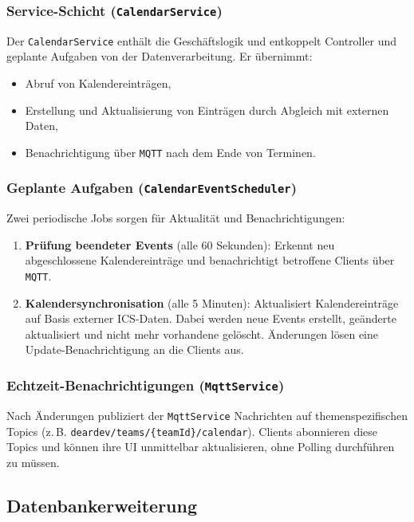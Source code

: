 \documentclass[12pt,a4paper]{report}
\begin{document}
    \subsubsection{Service-Schicht (\texttt{CalendarService})}
        Der \texttt{CalendarService} enthält die Geschäftslogik und entkoppelt Controller und geplante Aufgaben von der Datenverarbeitung.
        Er übernimmt:
        \begin{itemize}
            \item Abruf von Kalendereinträgen,
            \item Erstellung und Aktualisierung von Einträgen durch Abgleich mit externen Daten,
            \item Benachrichtigung über \texttt{MQTT} nach dem Ende von Terminen.
        \end{itemize}

    \subsubsection{Geplante Aufgaben (\texttt{CalendarEventScheduler})}
        Zwei periodische Jobs sorgen für Aktualität und Benachrichtigungen:
        \begin{enumerate}
            \item \textbf{Prüfung beendeter Events} (alle 60 Sekunden):
                Erkennt neu abgeschlossene Kalendereinträge und benachrichtigt betroffene Clients über \texttt{MQTT}.
            \item \textbf{Kalendersynchronisation} (alle 5 Minuten):
                Aktualisiert Kalendereinträge auf Basis externer ICS-Daten.
                Dabei werden neue Events erstellt, geänderte aktualisiert und nicht mehr vorhandene gelöscht.
                Änderungen lösen eine Update-Benachrichtigung an die Clients aus.
        \end{enumerate}

    \subsubsection{Echtzeit-Benachrichtigungen (\texttt{MqttService})}
        Nach Änderungen publiziert der \texttt{MqttService} Nachrichten auf themenspezifischen Topics (z.\,B. \texttt{deardev/teams/\{teamId\}/calendar}).
        Clients abonnieren diese Topics und können ihre UI unmittelbar aktualisieren, ohne Polling durchführen zu müssen.


\subsection{Datenbankerweiterung}
\end{document}
